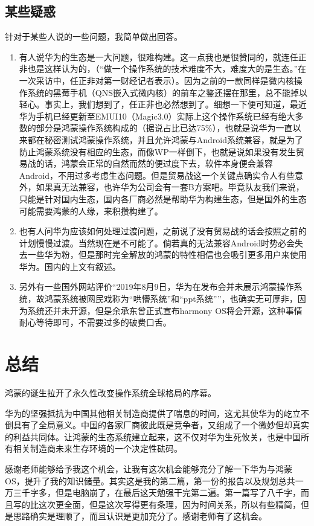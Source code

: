 \documentclass{article}
\begin{document}
\subsection{某些疑惑}
针对于某些人说的一些问题，我简单做出回答。\par
\begin{enumerate}
    \item {有人说华为的生态是一大问题，很难构建。这一点我也是很赞同的，就连任正非也是这样认为的，（“做一个操作系统的技术难度不大，难度大的是生态。”在一次采访中，任正非对第一财经记者表示）。因为之前的一款同样是微内核操作系统的黑莓手机（QNS嵌入式微内核）的前车之鉴还摆在那里，总不能掉以轻心。事实上，我们想到了，任正非也必然想到了。细想一下便可知道，最近华为手机已经更新至EMUI10（Magic3.0）实际上这个操作系统已经有绝大多数的部分是鸿蒙操作系统构成的（据说占比已达75\%），也就是说华为一直以来都在秘密测试鸿蒙操作系统，并且允许鸿蒙与Android系统兼容，就是为了防止鸿蒙系统没有相应的生态，而像WP一样倒下，也就是说如果没有发生贸易战的话，鸿蒙会正常的自然而然的便过度下去，软件本身便会兼容Android，不用过多考虑生态问题。但是贸易战这一个关键点确实令人有些意外，如果真无法兼容，也许华为公司会有一套B方案吧。毕竟队友我们来说，只能是针对国内生态，国内各厂商必然是帮助华为构建生态，但是国外的生态可能需要鸿蒙的人缘，来积攒构建了。}
    \item {也有人问华为应该如何处理过渡问题，之前说了没有贸易战的话会按照之前的计划慢慢过渡。当然现在是不可能了。倘若真的无法兼容Android时势必会失去一些华为粉，但是那时完全解放的鸿蒙的特性相信也会吸引更多用户来使用华为。国内的上文有叙述。\cite{ref6} } 
    \item {另外有一些国外网站评价“2019年8月9日，华为在发布会并未展示鸿蒙操作系统，故鸿蒙系统被网民戏称为“哄懵系统”和“ppt系统””，也确实无可厚非，因为系统还并未开源，但是余承东曾正式宣布harmony OS将会开源，这种事情耐心等待即可，不需要过多的破费口舌。}
 \end{enumerate} \par

\section{总结}
鸿蒙的诞生拉开了永久性改变操作系统全球格局的序幕。\par 
华为的坚强抵抗为中国其他相关制造商提供了喘息的时间，这尤其使华为的屹立不倒具有了全局意义。中国的各家厂商彼此既是竞争者，又组成了一个微妙但却真实的利益共同体。让鸿蒙的生态系统建立起来，这不仅对华为生死攸关，也是中国所有相关制造商未来生存环境的一个决定性砝码。\cite{ref7}\par 
感谢老师能够给予我这个机会，让我有这次机会能够充分了解一下华为与鸿蒙OS，提升了我的知识储量。其实这是我的第二篇，第一份的报告以及规划总共一万三千字多，但是电脑崩了，在最后这天勉强干完第二遍。第一篇写了八千字，而且写的比这次更全面，但是这次写得更有条理，因为时间关系，所以有些精简，但是思路确实是理顺了，而且认识是更加充分了。感谢老师有了这机会。\par
\end{document}
